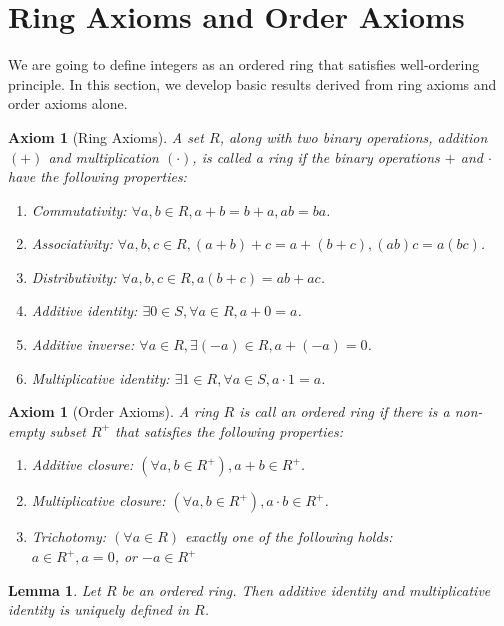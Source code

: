 \documentclass{article}
\newtheorem{lem}[thm]{Lemma}
\newtheorem{axiom}[thm]{Axiom}
\begin{document}
\section{Ring Axioms and Order Axioms}
We are going to define integers as an ordered ring that satisfies well-ordering principle. In this section, we develop basic results derived from ring axioms and order axioms alone.
\begin{axiom}[Ring Axioms]
\label{ring axiom}
A set $R$, along with two binary operations, addition $(+)$ and multiplication $(\cdot)$, is called a ring if the binary operations $+$ and $\cdot$ have the following properties: 
\begin{enumerate}
    \item Commutativity: $\forall a, b \in R, a+b=b+a, a b=b a$.
    \item Associativity: $\forall a, b, c \in R, (a+b)+c=a+(b+c), (a b) c = a (b c)$.
    \item Distributivity: $\forall a, b, c \in R, a(b+c)=ab+ac$.
    \item Additive identity: $\exists 0 \in S, \forall a \in R, a + 0 = a$.
    \item Additive inverse: $\forall a \in R, \exists (-a) \in R, a + (-a) = 0$.
    \item Multiplicative identity: $\exists 1 \in R, \forall a \in S, a \cdot 1 = a$.
\end{enumerate}
\end{axiom}

\begin{axiom}[Order Axioms]
\label{order axiom}
A ring $R$ is call an ordered ring if there is a non-empty subset $R^{+}$ that satisfies the following properties:
\begin{enumerate}
    \item Additive closure: $(\forall a,b \in R^{+}), a+b \in R^{+} $.
    \item Multiplicative closure: $(\forall a,b \in R^{+}), a\cdot b \in R^{+} $.
    \item Trichotomy: $(\forall a \in R)$ exactly one of the following holds:
    \\
    $a\in R^{+}, a=0$, or $-a\in R^{+}$
\end{enumerate}


\end{axiom}


\begin{lem} Let $R$ be an ordered ring. Then additive identity and multiplicative identity is uniquely defined in $R$.
\label{0.1}
\end{lem}
\end{document}
